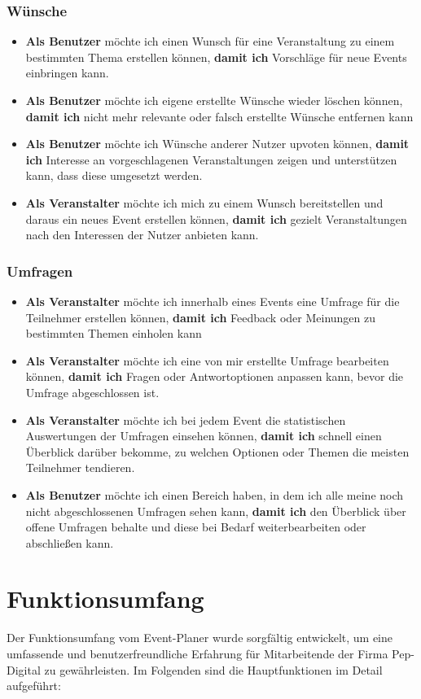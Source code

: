 \documentclass[a4paper,12pt]{article}
\begin{document}
\subsubsection{Wünsche}
\begin{itemize}
  \item \textbf{Als Benutzer} möchte ich einen Wunsch für eine Veranstaltung zu einem bestimmten Thema erstellen können, \textbf{damit ich} Vorschläge für neue Events einbringen kann.
  \item \textbf{Als Benutzer} möchte ich eigene erstellte Wünsche wieder löschen können, \textbf{damit ich} nicht mehr relevante oder falsch erstellte Wünsche entfernen kann
  \item \textbf{Als Benutzer} möchte ich Wünsche anderer Nutzer upvoten können, \textbf{damit ich} Interesse an vorgeschlagenen Veranstaltungen zeigen und unterstützen kann, dass diese umgesetzt werden.
  \item \textbf{Als Veranstalter} möchte ich mich zu einem Wunsch bereitstellen und daraus ein neues Event erstellen können, \textbf{damit ich} gezielt Veranstaltungen nach den Interessen der Nutzer anbieten kann.
\end{itemize}
\subsubsection{Umfragen}
\begin{itemize}
  \item \textbf{Als Veranstalter} möchte ich innerhalb eines Events eine Umfrage für die Teilnehmer erstellen können, \textbf{damit ich} Feedback oder Meinungen zu bestimmten Themen einholen kann
  \item \textbf{Als Veranstalter} möchte ich eine von mir erstellte Umfrage bearbeiten können, \textbf{damit ich} Fragen oder Antwortoptionen anpassen kann, bevor die Umfrage abgeschlossen ist.
  \item \textbf{Als Veranstalter} möchte ich bei jedem Event die statistischen Auswertungen der Umfragen einsehen können, \textbf{damit ich} schnell einen Überblick darüber bekomme, zu welchen Optionen oder Themen die meisten Teilnehmer tendieren.
  \item \textbf{Als Benutzer} möchte ich einen Bereich haben, in dem ich alle meine noch nicht abgeschlossenen Umfragen sehen kann, \textbf{damit ich} den Überblick über offene Umfragen behalte und diese bei Bedarf weiterbearbeiten oder abschließen kann.
\end{itemize}
\newpage
\section{Funktionsumfang}
Der Funktionsumfang vom Event-Planer wurde sorgfältig entwickelt, um eine umfassende und benutzerfreundliche Erfahrung für Mitarbeitende der Firma Pep-Digital zu gewährleisten. Im Folgenden sind die Hauptfunktionen im Detail aufgeführt:
\end{document}
